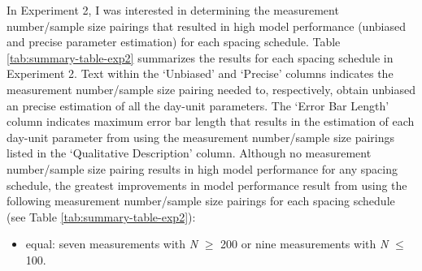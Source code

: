 \documentclass[
12pt, %
twoside,
english]{guelphthesis}
\begin{document}
In Experiment 2, I was interested in determining the measurement number/sample size pairings that resulted in high model performance (unbiased and precise parameter estimation) for each spacing schedule. Table \ref{tab:summary-table-exp2} summarizes the results for each spacing schedule in Experiment 2. Text within the `Unbiased' and `Precise' columns indicates the measurement number/sample size pairing needed to, respectively, obtain unbiased an precise estimation of all the day-unit parameters. The `Error Bar Length' column indicates maximum error bar length that results in the estimation of each day-unit parameter from using the measurement number/sample size pairings listed in the `Qualitative Description' column. Although no measurement number/sample size pairing results in high model performance for any spacing schedule, the greatest improvements in model performance result from using the following measurement number/sample size pairings for each spacing schedule (see Table \ref{tab:summary-table-exp2}):
\begin{itemize}
\tightlist
\item
  equal: seven measurements with \emph{N} \(\ge\) 200 or nine measurements with \emph{N} \(\le\) 100.
\end{itemize}
\end{document}
